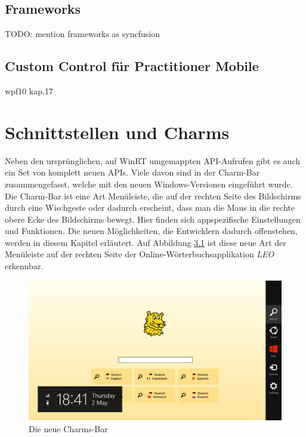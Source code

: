 \documentclass[a4paper,bibtotoc,oneside]{scrbook}
\begin{document}
\section[Frameworks]{Frameworks}
TODO: mention frameworks as syncfusion

\section[Custom Control für Practitioner Mobile]{Custom Control für Practitioner Mobile}
wpf10 kap.17


\chapter[Schnittstellen und Charms]{Schnittstellen und Charms}
Neben den ursprünglichen, auf WinRT umgemappten API-Aufrufen gibt es auch ein Set von komplett neuen APIs. Viele davon sind in der Charm-Bar zusammengefasst, welche mit den neuen Windows-Versionen eingeführt wurde. Die Charm-Bar ist eine Art Menüleiste, die auf der rechten Seite des Bildschirms durch eine Wischgeste oder dadurch erscheint, dass man die Maus in die rechte obere Ecke des Bildschirms bewegt. Hier finden sich appspezifische Einstellungen und Funktionen. Die neuen Möglichkeiten, die Entwicklern dadurch offenstehen, werden in diesem Kapitel erläutert.
Auf Abbildung \ref{Abb7} ist diese neue Art der Menüleiste auf der rechten Seite der Online-Wörterbuchsapplikation \textit{LEO} erkennbar.
\newline
\begin{figure}[htbp]
\centering
\includegraphics[scale=0.425]{images/charms.png}
\caption[Die neue Charms-Bart]{Die neue Charms-Bar}\label{Abb7}
\end{figure}
\newline
\end{document}
